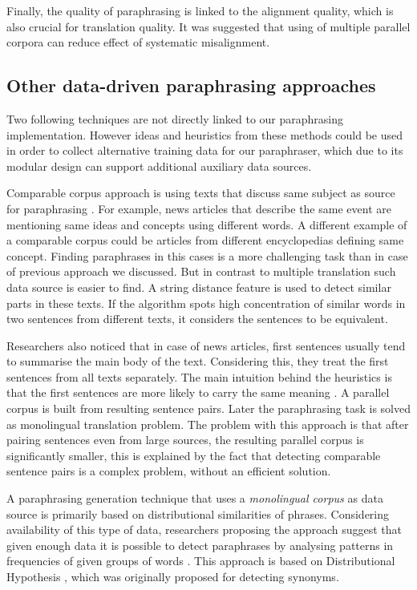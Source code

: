 Finally, the quality of paraphrasing is linked to the alignment quality, which is also crucial for translation quality. It was suggested that using of multiple parallel corpora can reduce effect of systematic misalignment.

\subsection{Other data-driven paraphrasing approaches}

Two following techniques are not directly linked to our paraphrasing implementation. However ideas and heuristics from these methods could be used in order to collect alternative training data for our paraphraser, which due to its modular design can support additional auxiliary data sources.  

Comparable corpus approach is using texts that discuss same subject as source for paraphrasing \citep{dolan2004unsupervised,dolan2005automatically}. For example, news articles that describe the same event are mentioning same ideas and concepts using different words. A different example of a comparable corpus could be articles from different encyclopedias defining same concept. Finding paraphrases in this cases is a more challenging task than in case of previous approach we discussed. But in contrast to multiple translation such data source is easier to find. A string distance feature is used to detect similar parts in these texts. If the algorithm spots high concentration of similar words in two sentences from different texts, it considers the sentences to be equivalent. 

Researchers also noticed that in case of news articles, first sentences usually tend to summarise the main body of the text. Considering this, they treat the first sentences from all texts separately. The main intuition behind the heuristics is that the first sentences are more likely to carry the same meaning \citep{dolan2005automatically}. A parallel corpus is built from resulting sentence pairs. Later the paraphrasing task is solved as monolingual translation problem. The problem with this approach is that after pairing sentences even from large sources, the resulting parallel corpus is significantly smaller, this is explained by the fact that detecting comparable sentence pairs is a complex problem, without an efficient solution.

A paraphrasing generation technique that uses a \textit{monolingual corpus} as data source is primarily based on distributional similarities of phrases. Considering availability of this type of data, researchers proposing the approach suggest that given enough data it is possible to detect paraphrases by analysing patterns in frequencies of given groups of words \citep{lin2001dirt}. This approach is based on Distributional Hypothesis \citep{harris1954distributional}, which was originally proposed for detecting synonyms.


